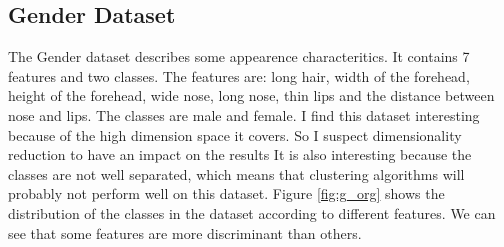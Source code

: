 \documentclass[twocolumn, 10pt]{article}
\begin{document}
		\subsection{Gender Dataset}
			The Gender dataset describes some appearence characteritics. It contains 7 features and two classes. The features are: long hair, width of the forehead, height of the forehead, wide nose, long nose, thin lips and the distance between nose and lips. The classes are male and female. I find this dataset interesting because of the high dimension space it covers. So I suspect dimensionality reduction to have an impact on the results  It is also interesting because the classes are not well separated, which means that clustering algorithms will probably not perform well on this dataset. Figure \ref{fig:g_org} shows the distribution of the classes in the dataset according to different features. We can see that some features are more discriminant than others.
\end{document}
